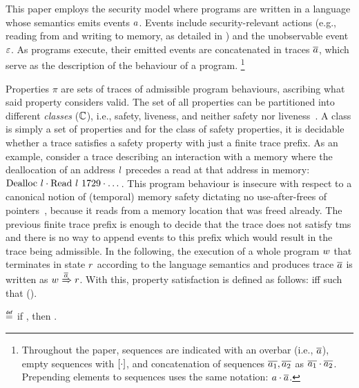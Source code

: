 \documentclass[utf8,acmsmall,review,screen,dvipsnames,anonymous]{acmart}
\begin{document}
This paper employs the security model where programs are written in a language whose semantics emits events $\event$.
Events include security-relevant actions (e.g., reading from and writing to memory, as detailed in ) and the unobservable event $\emptyevent$.
As programs execute, their emitted events are concatenated in traces $\trace$, which serve as the description of the behaviour of a program.%
\footnote{
Throughout the paper, sequences are indicated with an overbar (i.e., $\trace$), empty sequences with $\hole{\cdot}$, and concatenation of sequences $\trace[_{1}],\trace[_{2}]$ as $\trace[_{1}]\cdot\trace[_{2}]$.
Prepending elements to sequences uses the same notation: $\event\cdot\trace$.
}

Properties $\pi$ are sets of traces of admissible program behaviours, ascribing what said property considers valid.
The set of all properties can be partitioned into different {\em classes} ($\class$), i.e., safety, liveness, and neither safety nor liveness~\cite{clarkson2008hyper}.
A class is simply a set of properties and for the class of safety properties, it is decidable whether a trace satisfies a safety property with just a finite trace prefix.
As an example, consider a trace describing an interaction with a memory where the deallocation of an address $\loc$ precedes a read at that address in memory: $\ev{Dealloc\ \loc}\cdot\ev{Read\ \loc\ 1729}\cdot\dots$.
This program behaviour is insecure with respect to a canonical notion of (temporal) memory safety dictating no use-after-frees of pointers~\cite{nagarakatte2010cets,azevedo2018meaningsofms}, because it reads from a memory location that was freed already.
The previous finite trace prefix is enough to decide that the trace does not satisfy \gls*{tms} and there is no way to append events to this prefix which would result in the trace being admissible.
In the following, the execution of a whole program $\wholeprogvar$ that terminates in state $\runtimetermvar$ according to the language semantics and produces trace $\trace$ is written as $\progstepto{\wholeprogvar}{\runtimetermvar}{\trace}$.
With this, property satisfaction is defined as follows:
 iff  such that  ().

\begin{definition}\label{def:propsat}
  \bul{$\sat{\progvar}{\pi}$}
  $\isdef$
  if \iul{$\progstepto{\wholeprogvar}{\runtimetermvar}{\trace}$},
  then \oul{$\trace\in\pi$}.
\end{definition}
\end{document}
